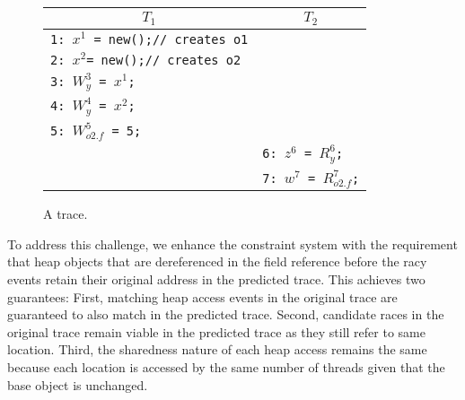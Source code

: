 \begin{figure}
	\centering
	\begin{tabular}{ll}
		\hline
		\multicolumn{1}{c}{$T_1$} & \multicolumn{1}{c}{$T_2$} \\
		\hline
		{\tt 1: $x^1$ = new();// creates o1} & \\
		{\tt 2: $x^2$= new();// creates o2} & \\
		{\tt 3: $W^3_{y}$ = $x^1$;} & \\
		{\tt 4: $W^4_{y}$ = $x^2$;} & \\
		{\tt 5: $W^5_{o2.f}$ = 5;} & \\	
		& {\tt 6: $z^6$ = $R^6_{y}$;} \\
		& {\tt 7: $w^7$ = $R^7_{o2.f}$;} \\
	\end{tabular}
	\caption{\label{fig:heapAccess} A trace.}
\end{figure}

To address this challenge, we enhance the constraint system with the requirement that heap objects that are dereferenced in the field reference before the racy events retain their original address in the predicted trace.
This achieves two guarantees: First, matching heap access events in the original trace are guaranteed to also match in the predicted trace. Second, candidate races in the original trace remain viable in the predicted trace as they still refer to same location. Third, the sharedness nature of each heap access remains the same because
each location is accessed by the same number of threads given that the base object is unchanged. 







